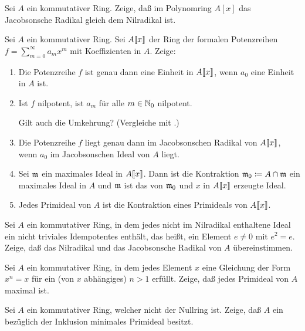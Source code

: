 \begin{exercise}
	Sei \(A\) ein kommutativer Ring. Zeige, daß im Polynomring \(A[x]\) das 
	Jacobsonsche Radikal gleich dem Nilradikal ist.
\end{exercise}

\begin{exercise}
	Sei \(A\) ein kommutativer Ring. Sei \(A\llbracket x\rrbracket\) der Ring der formalen
	Potenzreihen \(f = \sum\limits_{m = 0}^\infty a_m x^m\) mit Koeffizienten in
	\(A\). Zeige:
	\begin{enumerate}
	\item
		Die Potenzreihe \(f\) ist genau dann eine Einheit in \(A\llbracket x\rrbracket\), wenn
		\(a_0\) eine Einheit in \(A\) ist.
	\item
		Ist \(f\) nilpotent, ist \(a_m\) für alle \(m \in \mathbb N_0\) nilpotent.
		
		Gilt auch die Umkehrung? (Vergleiche mit .)
	\item
		Die Potenzreihe \(f\) liegt genau dann im Jacobsonschen Radikal von
		\(A\llbracket x\rrbracket\), wenn \(a_0\) im Jacobsonschen Ideal von \(A\) liegt.
	\item
		Sei \(\mathfrak{m}\) ein maximales Ideal in \(A\llbracket x\rrbracket\). Dann ist
		die Kontraktion \(\mathfrak{m}_0 \coloneqq A \cap \mathfrak{m}\) ein maximales Ideal
		in \(A\) und \(\mathfrak{m}\) ist das von \(\mathfrak{m}_0\) und \(x\) in \(A\llbracket x\rrbracket\)
		erzeugte Ideal.
	\item
		Jedes Primideal von \(A\) ist die Kontraktion eines Primideals von
		\(A\llbracket x\rrbracket\).
	\end{enumerate}
\end{exercise}

\begin{exercise}
	Sei \(A\) ein kommutativer Ring, in dem jedes nicht im Nilradikal enthaltene
	Ideal ein nicht triviales Idempotentes enthält, das heißt, ein Element
	\(e \neq 0\) mit \(e^2 = e\). Zeige, daß das Nilradikal und das Jacobsonsche
	Radikal von \(A\) übereinstimmen.
\end{exercise}

\begin{exercise}
	Sei \(A\) ein kommutativer Ring, in dem jedes Element \(x\) eine Gleichung der
	Form \(x^n = x\) für ein (von \(x\) abhängiges) \(n > 1\) erfüllt. Zeige, daß
	jedes Primideal von \(A\) maximal ist.
\end{exercise}

\begin{exercise}
	Sei \(A\) ein kommutativer Ring, welcher nicht der Nullring ist. Zeige, daß \(A\)
	ein bezüglich der Inklusion minimales Primideal besitzt.
\end{exercise}

